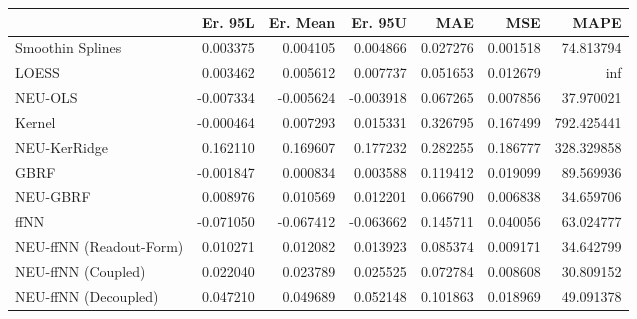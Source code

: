 \begin{tabular}{lrrrrrr}
\toprule
{} &   Er. 95L &  Er. Mean &   Er. 95U &       MAE &       MSE &        MAPE \\
\midrule
Smoothin Splines        &  0.003375 &  0.004105 &  0.004866 &  0.027276 &  0.001518 &   74.813794 \\
LOESS                   &  0.003462 &  0.005612 &  0.007737 &  0.051653 &  0.012679 &         inf \\
NEU-OLS                 & -0.007334 & -0.005624 & -0.003918 &  0.067265 &  0.007856 &   37.970021 \\
Kernel                  & -0.000464 &  0.007293 &  0.015331 &  0.326795 &  0.167499 &  792.425441 \\
NEU-KerRidge            &  0.162110 &  0.169607 &  0.177232 &  0.282255 &  0.186777 &  328.329858 \\
GBRF                    & -0.001847 &  0.000834 &  0.003588 &  0.119412 &  0.019099 &   89.569936 \\
NEU-GBRF                &  0.008976 &  0.010569 &  0.012201 &  0.066790 &  0.006838 &   34.659706 \\
ffNN                    & -0.071050 & -0.067412 & -0.063662 &  0.145711 &  0.040056 &   63.024777 \\
NEU-ffNN (Readout-Form) &  0.010271 &  0.012082 &  0.013923 &  0.085374 &  0.009171 &   34.642799 \\
NEU-ffNN (Coupled)      &  0.022040 &  0.023789 &  0.025525 &  0.072784 &  0.008608 &   30.809152 \\
NEU-ffNN (Decoupled)    &  0.047210 &  0.049689 &  0.052148 &  0.101863 &  0.018969 &   49.091378 \\
\bottomrule
\end{tabular}
